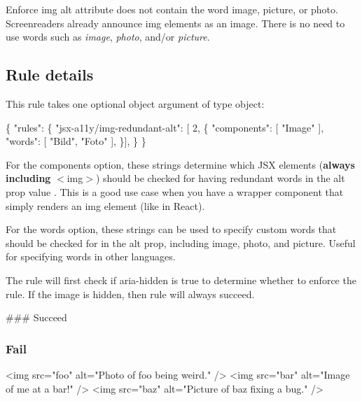 Enforce img alt attribute does not contain the word image, picture, or photo. Screenreaders already announce {\ttfamily img} elements as an image. There is no need to use words such as {\itshape image}, {\itshape photo}, and/or {\itshape picture}.

\subsection*{Rule details}

This rule takes one optional object argument of type object\+:


\begin{DoxyCode}
\{
    "rules": \{
        "jsx-a11y/img-redundant-alt": [ 2, \{
            "components": [ "Image" ],
            "words": [ "Bild", "Foto" ],
          \}],
    \}
\}
\end{DoxyCode}


For the {\ttfamily components} option, these strings determine which J\+SX elements ({\bfseries always including} {\ttfamily $<$img$>$}) should be checked for having redundant words in the {\ttfamily alt} prop value . This is a good use case when you have a wrapper component that simply renders an {\ttfamily img} element (like in React).

For the {\ttfamily words} option, these strings can be used to specify custom words that should be checked for in the alt prop, including {\ttfamily image}, {\ttfamily photo}, and {\ttfamily picture}. Useful for specifying words in other languages.

The rule will first check if {\ttfamily aria-\/hidden} is true to determine whether to enforce the rule. If the image is hidden, then rule will always succeed.

\#\#\# Succeed 


\subsubsection*{Fail}


\begin{DoxyCode}
<img src="foo" alt="Photo of foo being weird." />
<img src="bar" alt="Image of me at a bar!" />
<img src="baz" alt="Picture of baz fixing a bug." />
\end{DoxyCode}
 